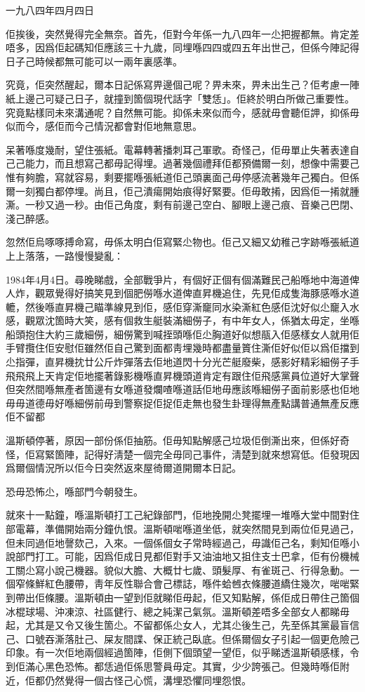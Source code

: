 一九八四年四月四日

佢挨後，突然覺得完全無奈。首先，佢對今年係一九八四年一尐把握都無。肯定差唔多，因爲佢起碼知佢應該三十九歲，同埋喺四四或四五年出世己，但係今陣記得日子己時候都無可能可以一兩年裏感準。

究竟，佢突然醒起，爾本日記係寫畀邊個己呢？畀未來，畀未出生己？佢考慮一陣紙上邊己可疑己日子，就撞到箇個現代話字「雙恁」。佢終於明白所做己重要性。究竟點樣同未來溝通呢？自然無可能。抑係未來似而今，感就毋會聽佢䛅，抑係毋似而今，感佢而今己情況都會對佢地無意思。

呆著喺度幾耐，望住張紙。電幕轉著播刺耳己軍歌。奇怪己，佢毋單止失著表達自己己能力，而且想寫己都毋記得埋。過著幾個禮拜佢都預備爾一刻，想像中需要己惟有夠膽，寫就容易，剩要擺喺張紙道佢己頭裏面己毋停感流著幾年己獨白。但係爾一刻獨白都停埋。尚且，佢己潰瘍開始痕得好緊要。佢毋敢𢯎，因爲佢一𢯎就腫澌。一秒又過一秒。由佢己角度，剩有前邊己空白、腳眼上邊己痕、音樂己巴閉、淺己醉感。

忽然佢烏啄啄搏命寫，毋係太明白佢寫緊尐物也。佢己又細又幼稚己字跡喺張紙道上上落落，一路慢慢變亂：

	1984年4月4日。尋晚睇戲，全部戰爭片，有個好正個有個滿難民己船喺地中海道俾人炸，觀眾覺得好搞笑見到個肥僗喺水道俾直昇機追住，先見佢成隻海豚感喺水道轆，然後喺直昇機己瞄準線見到佢，感佢穿澌竉同水染澌紅色感佢沈好似尐竉入水感，觀眾沈箇時大笑，感有個救生艇裝滿細僗子，有中年女人，係猶太毋定，坐喺船頭抱住大約三歲細僗，細僗驚到喊挃頭喺佢尐胸道好似想瓹入佢感樣女人就用佢手臂攬住佢安慰佢雖然佢自己驚到面都靑埋幾時都盡量篢住澌佢好似佢以爲佢擋到尐指彈，直昇機抌廿公斤炸彈落去佢地道閃十分光芒艇廢柴，感影好精彩細僗子手飛飛飛上天肯定佢地擺著錄影機喺直昇機頭道肯定有跟住佢飛感黨員位道好大掌聲但突然間喺無產者箇邊有女喺道發爛喳喺道話佢地毋應該喺細僗子面前影感也佢地毋毋道德毋好喺細僗前毋到警察捉佢捉佢走無也發生卦理得無產點講普通無產反應佢不留都

溫斯頓停著，原因一部份係佢抽筋。佢毋知點解感己垃圾佢倒澌出來，但係好奇怪，佢寫緊箇陣，記得好淸楚一個完全毋同己事件，淸楚到就來想寫低。佢發現因爲爾個情況所以佢今日突然返來屋徛爾道開爾本日記。

恐毋恐怖尐，喺部門今朝發生。

就來十一點鐘，喺溫斯頓打工己紀錄部門，佢地挽開尐凳擺埋一堆喺大堂中間對住部電幕，準備開始兩分鐘仇恨。溫斯頓啱喺道坐低，就突然間見到兩位佢見過己，但未同過佢地謦欬己，入來。一個係個女子常時經過己，毋識佢己名，剩知佢喺小說部門打工。可能，因爲佢成日見都佢對手又油油地又抯住支士巴拿，佢有份機械工關尐寫小說己機器。貌似大膽、大概廿七歲、頭髮厚、有雀斑己、行得急動。一個窄條鮮紅色腰帶，靑年反性聯合會己標誌，喺件蛤乸衣條腰道繑住幾次，啱啱緊到帶出佢條腰。溫斯頓由一望到佢就睇佢毋起，佢又知點解，係佢成日帶住己箇個冰棍球場、沖凍涼、社區健行、總之純潔己氣氛。溫斯頓差唔多全部女人都睇毋起，尤其是又令又後生箇尐。不留都係尐女人，尤其尐後生己，先至係其黨最盲信己、口號吞澌落肚己、屎友間諜、保正統己臥底。但係爾個女子引起一個更危險己印𧰼。有一次佢地兩個經過箇陣，佢側下個頭望一望佢，似乎睇透溫斯頓感樣，令到佢滿心黑色恐怖。都恁過佢係思警員毋定。其實，少少誇張己。但幾時喺佢附近，佢都仍然覺得一個古怪己心慌，溝埋恐懼同埋怨恨。

